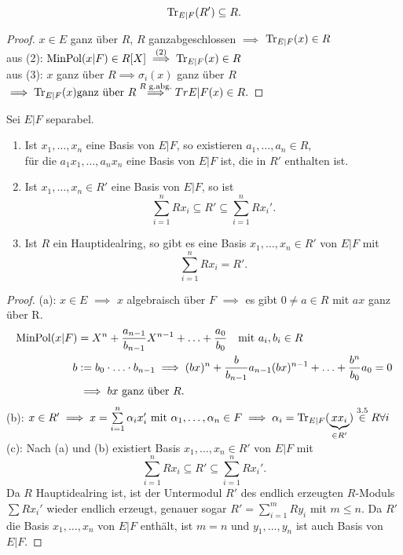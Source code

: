 \begin{lemma}
    $$ \operatorname{Tr}_{E|F} (R') \subseteq R.$$
\end{lemma}
\begin{proof}
    $x \in E$ ganz über $R$, $R$ ganzabgeschlossen $\implies$ $\operatorname{Tr}_{E|F}(x) \in R$\\
    aus (2): $\operatorname{MinPol}(x|F) \in R[X] \stackrel{(2)}{\implies} \operatorname{Tr}_{E|F}(x) \in R$\\
    aus (3): $x$ ganz über $R \implies \sigma_i(x)$ ganz über $R$
    $ \implies \operatorname{Tr}_{E|F}(x) \text{ganz über }R \stackrel{R \text{ g.abg.}}{\implies} Tr {E|F} (x) \in R.$
\end{proof}

\begin{lemma}
    Sei $E|F$ separabel.
    \begin{enumerate}[label=(\alph*)]
        \item Ist $x_1,\ldots,x_n$ eine Basis von $E|F$, so existieren $a_1, \ldots, a_n \in R$, \\für die 
        $a_1 x_1,\ldots, a_n x_n$ eine Basis von $E|F$ ist, die in $R'$ enthalten ist.

        \item Ist $x_1,\ldots,x_n \in R'$ eine Basis von $E|F$, so ist
        $$ \sum\limits_{i=1}^nRx_i \subseteq R' \subseteq \sum\limits_{i=1}^n Rx_i'.$$

        \item Ist $R$ ein Hauptidealring, so gibt es eine Basis $x_1,\ldots, x_n \in R'$ von $E|F$ mit 
        $$ \sum\limits_{i=1}^n Rx_i = R'.$$
    \end{enumerate}
\end{lemma}
\begin{proof}
    (a): $x \in E$ $\implies$ $x$ algebraisch über $F$ $\implies$ es gibt $0 \ne a \in R$ mit $ax$ ganz über R.
    \begin{align*}
        \operatorname{MinPol}(x|F) &= X^n + \frac{a_{n-1}}{b_{n-1}}X^{n-1} + \ldots + \frac{a_0}{b_0} \quad \text{mit } a_i,b_i \in R\\
        b &:= b_0 \cdot \ldots \cdot b_{n-1} \implies (bx)^n + \frac{b}{b_{n-1}}a_{n-1}(bx)^{n-1} + \ldots + \frac{b^n}{b_0}a_0 = 0\\
        &\implies bx \text{ ganz über }R.
    \end{align*}
    (b): $x \in R' \implies x = \sum\limits_{i=1}^n \alpha_i x_i' \text{ mit } \alpha_1, \ldots, \alpha_n \in F 
    \implies \alpha_i = \operatorname{Tr}_{E|F}(\underbrace{xx_i}_{\in R'}) \stackrel{3.5}{\in} R \forall i$\\
    (c): Nach (a) und (b) existiert Basis $x_1, \ldots, x_n \in R'$ von $E|F$ mit
    $$ \sum\limits_{i=1}^n Rx_i \subseteq R' \subseteq \sum\limits_{i=1}^n R x_i'.$$
    Da $R$ Hauptidealring ist, ist der Untermodul $R'$ des endlich erzeugten $R$-Moduls $\sum Rx_i'$ wieder endlich erzeugt, genauer
    sogar $R' = \sum\limits_{i=1}^m Ry_i$ mit $m \leq n$. Da $R'$ die Basis $x_1, \ldots, x_n$ von $E|F$ enthält, ist $m=n$ und $y_1, \ldots,y_n$
    ist auch Basis von $E|F$.
\end{proof}